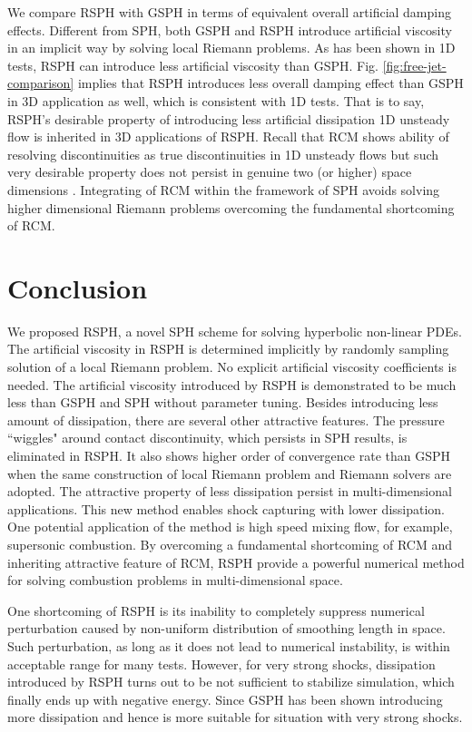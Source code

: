 \documentclass[review]{elsarticle}
\begin{document}
We compare RSPH with GSPH in terms of equivalent overall artificial damping effects. Different from SPH, both GSPH and RSPH introduce artificial viscosity in an implicit way by solving local Riemann problems. As has been shown in 1D tests, RSPH can introduce less artificial viscosity than GSPH. Fig. \ref{fig:free-jet-comparison} implies that RSPH introduces less overall damping effect than GSPH in 3D application as well, which is consistent with 1D tests. That is to say, RSPH's desirable property of introducing less artificial dissipation 1D unsteady flow is inherited in 3D applications of RSPH. Recall that RCM shows ability of resolving discontinuities as true discontinuities in 1D unsteady flows but such very desirable property does not persist in genuine two (or higher) space dimensions \citep{colella1982glimm}. Integrating of RCM within the framework of SPH avoids solving higher dimensional Riemann problems overcoming the fundamental shortcoming of RCM.

\section{Conclusion}
We proposed RSPH, a novel SPH scheme for solving hyperbolic non-linear PDEs. The artificial viscosity in RSPH is determined implicitly by randomly sampling solution of a local Riemann problem. No explicit artificial viscosity coefficients is needed. The artificial viscosity introduced by RSPH is demonstrated to be much less than GSPH and SPH without parameter tuning. Besides introducing less amount of dissipation, there are several other attractive features. The pressure ``wiggles" around contact discontinuity, which persists in SPH results, is eliminated in RSPH. It also shows higher order of convergence rate than GSPH when the same construction of local Riemann problem and Riemann solvers are adopted. The attractive property of less dissipation persist in multi-dimensional applications.
This new method enables shock capturing with lower dissipation. One potential application of the method is high speed mixing flow, for example, supersonic combustion.
By overcoming a fundamental shortcoming of RCM and inheriting attractive feature of RCM, RSPH provide a powerful numerical method for solving combustion problems in multi-dimensional space.

One shortcoming of RSPH is its inability to completely suppress numerical perturbation caused by non-uniform distribution of smoothing length in space. Such perturbation, as long as it does not lead to numerical instability, is within acceptable range for many tests. However, for very strong shocks, dissipation introduced by RSPH turns out to be not sufficient to stabilize simulation, which finally ends up with negative energy. Since GSPH has been shown introducing more dissipation and hence is more suitable for situation with very strong shocks.
\end{document}
